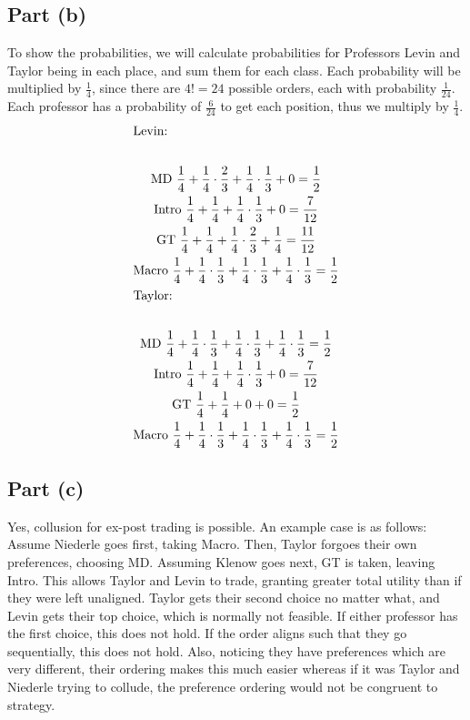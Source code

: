 \documentclass[10pt,a4paper]{article}
\begin{document}
  \subsection*{Part (b)}
    To show the probabilities, we will calculate probabilities for Professors Levin and Taylor being in each place, and sum them for each class. Each probability will be multiplied by $\frac{1}{4}$, since there are $4! = 24$ possible orders, each with probability $\frac{1}{24}$. Each professor has a probability of $\frac{6}{24}$ to get each position, thus we multiply by $\frac{1}{4}$. 
    \begin{gather*}
      \shortintertext{Levin:} \\
      \text{MD} \ \frac{1}{4} + \frac{1}{4}\cdot\frac{2}{3} + \frac{1}{4}\cdot\frac{1}{3} + 0 = \frac{1}{2} \\
      \text{Intro} \ \frac{1}{4} + \frac{1}{4} + \frac{1}{4}\cdot\frac{1}{3} + 0 = \frac{7}{12} \\
      \text{GT} \ \frac{1}{4} + \frac{1}{4} + \frac{1}{4}\cdot\frac{2}{3} + \frac{1}{4} = \frac{11}{12} \\
      \text{Macro} \ \frac{1}{4} + \frac{1}{4}\cdot\frac{1}{3} + \frac{1}{4}\cdot\frac{1}{3} + \frac{1}{4}\cdot\frac{1}{3} = \frac{1}{2} \\
      \shortintertext{Taylor:} \\
      \text{MD} \ \frac{1}{4} + \frac{1}{4}\cdot\frac{1}{3} + \frac{1}{4}\cdot\frac{1}{3} + \frac{1}{4}\cdot\frac{1}{3} = \frac{1}{2} \\
      \text{Intro} \ \frac{1}{4} + \frac{1}{4} + \frac{1}{4}\cdot\frac{1}{3} + 0 = \frac{7}{12} \\
      \text{GT} \ \frac{1}{4} + \frac{1}{4} + 0 + 0 = \frac{1}{2} \\
      \text{Macro} \ \frac{1}{4} + \frac{1}{4}\cdot\frac{1}{3} + \frac{1}{4}\cdot\frac{1}{3} + \frac{1}{4}\cdot\frac{1}{3} = \frac{1}{2} \\
    \end{gather*}
  \subsection*{Part (c)}
    Yes, collusion for ex-post trading is possible. An example case is as follows: Assume Niederle goes first, taking Macro. Then, Taylor forgoes their own preferences, choosing MD. Assuming Klenow goes next, GT is taken, leaving Intro. This allows Taylor and Levin to trade, granting greater total utility than if they were left unaligned. Taylor gets their second choice no matter what, and Levin gets their top choice, which is normally not feasible. If either professor has the first choice, this does not hold. If the order aligns such that they go sequentially, this does not hold. Also, noticing they have preferences which are very different, their ordering makes this much easier whereas if it was Taylor and Niederle trying to collude, the preference ordering would not be congruent to strategy.
    
\end{document}
